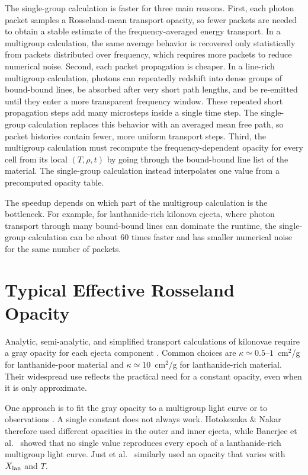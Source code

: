\documentclass[final,5p,times,twocolumn]{elsarticle}
\begin{document}
    The single-group calculation is faster for three main reasons. First, each photon packet
    samples a Rosseland-mean transport opacity, so fewer packets are needed to obtain a stable
    estimate of the frequency-averaged energy transport. In a multigroup calculation, the same
    average behavior is recovered only statistically from packets distributed over frequency,
    which requires more packets to reduce numerical noise. Second, each packet propagation is
    cheaper. In a line-rich multigroup calculation, photons can repeatedly redshift into dense
    groups of bound-bound lines, be absorbed after very short path lengths, and be re-emitted
    until they enter a more transparent frequency window. These repeated short propagation
    steps add many microsteps inside a single time step. The single-group calculation replaces
    this behavior with an averaged mean free path, so packet histories contain fewer, more
    uniform transport steps. Third, the multigroup calculation must recompute the
    frequency-dependent opacity for every cell from its local $(T,\rho,t)$ by going through the
    bound-bound line list of the material. The single-group calculation instead interpolates
    one value from a precomputed opacity table.

    The speedup depends on which part of the multigroup calculation is the bottleneck.
    For example, for lanthanide-rich kilonova ejecta, where photon transport through many bound-bound lines
    can dominate the runtime, the single-group calculation can be about 60 times faster and has
    smaller numerical noise for the same number of packets.

\section{Typical Effective Rosseland Opacity}
\label{SecTypicalOpacity}

    Analytic, semi-analytic, and simplified transport calculations of kilonovae require a gray
    opacity for each ejecta component
    \cite{villar2017combined,metzger2019kilonovae,collins2023critical,hotokezaka2020macronova,just2022properties}.
    Common choices are $\kappa\simeq0.5$--$1$~cm$^2$/g for lanthanide-poor material and
    $\kappa\simeq10$~cm$^2$/g for lanthanide-rich material. Their widespread use reflects the
    practical need for a constant opacity, even when it is only approximate.

    One approach is to fit the gray opacity to a multigroup light curve or to observations
    \cite{tanaka2013radiative,villar2017combined}. A single constant does not always work.
    Hotokezaka \& Nakar \cite{hotokezaka2020macronova} therefore used different opacities in the
    outer and inner ejecta, while Banerjee et al.\ \cite{banerjee2024diversity} showed that no single
    value reproduces every epoch of a lanthanide-rich multigroup light curve. Just et al.\
    \cite{just2022properties} similarly used an opacity that varies with $X_{\rm lan}$ and $T$.
\end{document}
